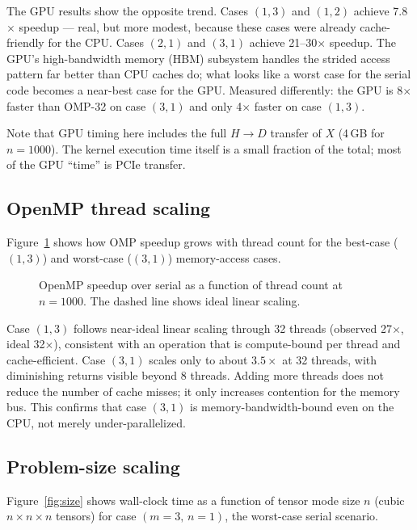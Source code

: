 \documentclass[11pt]{article}
\begin{document}
The GPU results show the opposite trend.  Cases $(1,3)$ and $(1,2)$
achieve 7.8$\times$ speedup --- real, but more modest, because these
cases were already cache-friendly for the CPU.  Cases $(2,1)$ and $(3,1)$
achieve 21--30$\times$ speedup.  The GPU's high-bandwidth memory
(HBM) subsystem handles the strided access pattern far better than
CPU caches do; what looks like a worst case for the serial code becomes
a near-best case for the GPU.  Measured differently: the GPU is 8$\times$
faster than OMP-32 on case $(3,1)$ and only 4$\times$ faster on case $(1,3)$.

Note that GPU timing here includes the full $H{\to}D$ transfer of $X$
(4\,GB for $n=1000$).  The kernel execution time itself is a small
fraction of the total; most of the GPU ``time'' is PCIe transfer.

\subsection{OpenMP thread scaling}

Figure~\ref{fig:scaling} shows how OMP speedup grows with thread count
for the best-case ($(1,3)$) and worst-case ($(3,1)$) memory-access cases.

\begin{figure}[h]
\centering
\resizebox{0.85\linewidth}{!}{}
\caption{OpenMP speedup over serial as a function of thread count at
         $n=1000$.  The dashed line shows ideal linear scaling.}
\label{fig:scaling}
\end{figure}

Case $(1,3)$ follows near-ideal linear scaling through 32 threads
(observed 27$\times$, ideal 32$\times$), consistent with an operation
that is compute-bound per thread and cache-efficient.  Case $(3,1)$
scales only to about $3.5\times$ at 32 threads, with diminishing returns
visible beyond 8 threads.  Adding more threads does not reduce the
number of cache misses; it only increases contention for the memory bus.
This confirms that case $(3,1)$ is memory-bandwidth-bound even on the CPU,
not merely under-parallelized.

\subsection{Problem-size scaling}

Figure~\ref{fig:size} shows wall-clock time as a function of tensor mode
size $n$ (cubic $n{\times}n{\times}n$ tensors) for case $(m{=}3,\,n{=}1)$,
the worst-case serial scenario.
\end{document}
